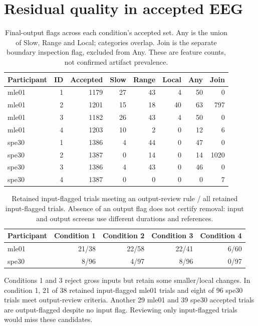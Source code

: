 \documentclass[11pt,a4paper]{article}
\begin{document}
\section{Residual quality in accepted EEG}
\begin{table}[H]\centering\small
\begin{tabular}{@{}lrrrrrrr@{}}\toprule
Participant & ID & Accepted & Slow & Range & Local & Any & Join\\\midrule
mle01 & 1 & 1179 & 27 & 43 & 4 & 50 & 0 \\
mle01 & 2 & 1201 & 15 & 18 & 40 & 63 & 797 \\
mle01 & 3 & 1182 & 26 & 43 & 4 & 50 & 0 \\
mle01 & 4 & 1203 & 10 & 2 & 0 & 12 & 6 \\
spe30 & 1 & 1386 & 4 & 44 & 0 & 47 & 0 \\
spe30 & 2 & 1387 & 0 & 14 & 0 & 14 & 1020 \\
spe30 & 3 & 1386 & 4 & 43 & 0 & 46 & 0 \\
spe30 & 4 & 1387 & 0 & 0 & 0 & 0 & 7 \\
\bottomrule\end{tabular}
\caption{Final-output flags across each condition's accepted set. Any is the union of Slow, Range and Local; categories overlap. Join is the separate boundary inspection flag, excluded from Any. These are feature counts, not confirmed artifact prevalence.}\label{tab:quality}
\end{table}
\begin{table}[H]\centering
\begin{tabular}{@{}lrrrr@{}}\toprule
Participant & Condition 1 & Condition 2 & Condition 3 & Condition 4\\\midrule
mle01 & 21/38 & 22/58 & 22/41 & 6/60 \\
spe30 & 8/96 & 4/97 & 8/96 & 0/97 \\
\bottomrule\end{tabular}
\caption{Retained input-flagged trials meeting an output-review rule / all retained input-flagged trials. Absence of an output flag does not certify removal: input and output screens use different durations and references.}\label{tab:followup}
\end{table}
Conditions 1 and 3 reject gross inputs but retain some smaller/local changes. In condition 1, 21 of 38 retained input-flagged mle01 trials and eight of 96 spe30 trials meet output-review criteria. Another 29 mle01 and 39 spe30 accepted trials are output-flagged despite no input flag. Reviewing only input-flagged trials would miss these candidates.
\end{document}
